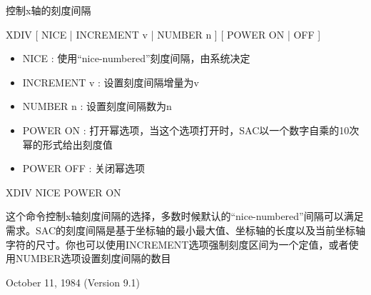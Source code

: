 \label{cmd:xdiv}

控制x轴的刻度间隔

XDIV [ NICE | INCREMENT v | NUMBER n ] [ POWER ON | OFF ]

\begin{itemize}
\item NICE : 使用``nice-numbered''刻度间隔，由系统决定 
\item INCREMENT v : 设置刻度间隔增量为v  
\item NUMBER n : 设置刻度间隔数为n  
\item POWER ON : 打开幂选项，当这个选项打开时，SAC以一个数字自乘的10次幂的形式给出刻度值 
\item POWER OFF : 关闭幂选项 
\end{itemize}

XDIV NICE POWER ON

这个命令控制x轴刻度间隔的选择，多数时候默认的``nice-numbered''间隔可以满足需求。SAC的刻度间隔是基于坐标轴的最小最大值、坐标轴的长度以及当前坐标轴字符的尺寸。你也可以使用INCREMENT选项强制刻度区间为一个定值，或者使用NUMBER选项设置刻度间隔的数目

October 11, 1984 (Version 9.1)
